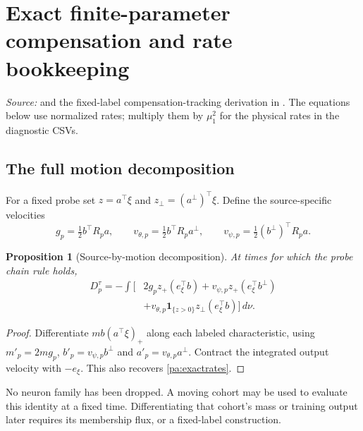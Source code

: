 \documentclass[11pt]{article}
\numberwithin{equation}{section}
\newtheorem{proposition}{Proposition}[section]
\theoremstyle{definition}
\theoremstyle{remark}
\newcommand{\1}{\mathbf 1}
\newcommand{\dd}{\,d}
\newcommand{\source}[1]{\par\noindent\textit{Source:} #1\par\smallskip}
\begin{document}
\section{Exact finite-parameter compensation and rate bookkeeping}
\label{pa:bookkeeping}
\source{\cite{LC} and the fixed-label compensation-tracking derivation in
\cite{C}. The equations below use normalized rates; multiply them by
$\mu_1^2$ for the physical rates in the diagnostic CSVs.}

\subsection{The full motion decomposition}
For a fixed probe set $z=a^\top\xi$ and $z_\perp=(a^\perp)^\top\xi$.
Define the source-specific velocities
\[
 g_p=\tfrac12b^\top R_pa,\qquad
 v_{\theta,p}=\tfrac12b^\top R_pa^\perp,\qquad
 v_{\psi,p}=\tfrac12(b^\perp)^\top R_pa.
\]
\begin{proposition}[Source-by-motion decomposition]\label{pa:motion}
At times for which the probe chain rule holds,
\begin{align}\label{pa:motion-eq}
 D_p^\tau=-\int\big[&2g_pz_+(e_\xi^\top b)
 +v_{\psi,p}z_+(e_\xi^\top b^\perp)\nonumber\\
 &+v_{\theta,p}\1_{\{z>0\}}z_\perp(e_\xi^\top b)\big]\dd\nu.
\end{align}
\end{proposition}
\begin{proof}
Differentiate $m b(a^\top\xi)_+$ along each labeled characteristic,
using $m'_p=2mg_p$, $b'_p=v_{\psi,p}b^\perp$ and
$a'_p=v_{\theta,p}a^\perp$. Contract the integrated output velocity
with $-e_\xi$. This also recovers \eqref{pa:exactrates}.
\end{proof}
No neuron family has been dropped. A moving cohort may be used to evaluate
this identity at a fixed time. Differentiating that cohort's mass or training
output later requires its membership flux, or a fixed-label construction.
\end{document}
